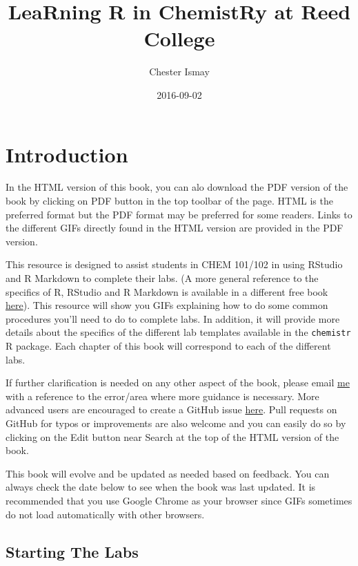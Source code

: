 \documentclass[]{tufte-book}
\title{LeaRning R in ChemistRy at Reed College}
\author{Chester Ismay}
\date{2016-09-02}
\begin{document}
\maketitle



{
\setcounter{tocdepth}{1}
\tableofcontents
}

\chapter*{Introduction}\label{introduction}

In the HTML version of this book, you can alo download the PDF version
of the book by clicking on PDF button in the top toolbar of the page.
HTML is the preferred format but the PDF format may be preferred for
some readers. Links to the different GIFs directly found in the HTML
version are provided in the PDF version.

This resource is designed to assist students in CHEM 101/102 in using
RStudio and R Markdown to complete their labs. (A more general reference
to the specifics of R, RStudio and R Markdown is available in a
different free book \href{http://ismayc.github.io/rbasics-book}{here}).
This resource will show you GIFs explaining how to do some common
procedures you'll need to do to complete labs. In addition, it will
provide more details about the specifics of the different lab templates
available in the \texttt{chemistr} R package. Each chapter of this book
will correspond to each of the different labs.

If further clarification is needed on any other aspect of the book,
please email \href{mailto:cismay@reed.edu}{me} with a reference to the
error/area where more guidance is necessary. More advanced users are
encouraged to create a GitHub issue
\href{https://github.com/ismayc/chemistr-book-source/issues}{here}. Pull
requests on GitHub for typos or improvements are also welcome and you
can easily do so by clicking on the Edit button near Search at the top
of the HTML version of the book.

This book will evolve and be updated as needed based on feedback. You
can always check the date below to see when the book was last updated.
It is recommended that you use Google Chrome as your browser since GIFs
sometimes do not load automatically with other browsers.

\section{Starting The Labs}\label{begin}
\end{document}

